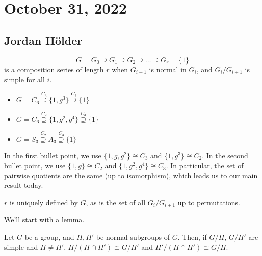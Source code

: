 \section{October 31, 2022}

\subsection{Jordan H{\"o}lder}

\begin{definition}
\[G = G_0\supseteq G_1\supseteq G_2\supseteq \hdots \supseteq G_r = \{1\}\]
is a \ac{composition series} of length $r$ when $G_{i+1}$ is normal in $G_i$, and $G_i/G_{i+1}$ is simple for all $i$.
\end{definition}

\begin{example}
\exlabel

\begin{itemize}
    \item $G = C_6 \overset{C_3}{\supseteq} \{1, g^3\} \overset{C_2}{\supseteq} \{1\}$
    \item $G = C_6 \overset{C_2}{\supseteq} \{1, g^2, g^4\} \overset{C_3}{\supseteq} \{1\}$
    \item $G = S_3 \overset{C_2}{\supseteq} A_3 \overset{C_3}{\supseteq} \{1\}$
\end{itemize}
\end{example}

In the first bullet point, we use $\{1, g, g^2\}\cong C_3$ and $\{1, g^3\}\cong C_2$. In the second bullet point, we use $\{1, g\}\cong C_2$ and $\{1, g^2, g^4\}\cong C_3$. In particular, the set of pairwise quotients are the same (up to isomorphism), which leads us to our main result today. 

\begin{theorem}

$r$ is uniquely defined by $G$, as is the set of all $G_i/G_{i+1}$ up to permutations.
\end{theorem}

We'll start with a lemma.

\begin{theorem}
\lemlabel

Let $G$ be a group, and $H,H'$ be normal subgroups of $G$. Then, if $G/H$, $G/H'$ are simple and $H\neq H'$, $H/(H\cap H')\cong G/H'$ and $H'/(H\cap H')\cong G/H$.
\end{theorem}


